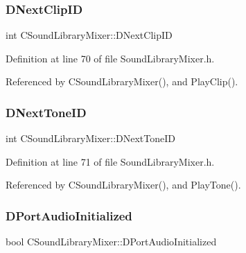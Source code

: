 \subsubsection{\texorpdfstring{D\+Next\+Clip\+ID}{DNextClipID}}
{\footnotesize\ttfamily int C\+Sound\+Library\+Mixer\+::\+D\+Next\+Clip\+ID\hspace{0.3cm}{\ttfamily [protected]}}



Definition at line 70 of file Sound\+Library\+Mixer.\+h.



Referenced by C\+Sound\+Library\+Mixer(), and Play\+Clip().

\hypertarget{classCSoundLibraryMixer_a88efc1ea710744bceadccf66967f9736}{}\label{classCSoundLibraryMixer_a88efc1ea710744bceadccf66967f9736} 
\subsubsection{\texorpdfstring{D\+Next\+Tone\+ID}{DNextToneID}}
{\footnotesize\ttfamily int C\+Sound\+Library\+Mixer\+::\+D\+Next\+Tone\+ID\hspace{0.3cm}{\ttfamily [protected]}}



Definition at line 71 of file Sound\+Library\+Mixer.\+h.



Referenced by C\+Sound\+Library\+Mixer(), and Play\+Tone().

\hypertarget{classCSoundLibraryMixer_a1c78419f5e6cfdf4bc879bb5eedf52f0}{}\label{classCSoundLibraryMixer_a1c78419f5e6cfdf4bc879bb5eedf52f0} 
\subsubsection{\texorpdfstring{D\+Port\+Audio\+Initialized}{DPortAudioInitialized}}
{\footnotesize\ttfamily bool C\+Sound\+Library\+Mixer\+::\+D\+Port\+Audio\+Initialized\hspace{0.3cm}{\ttfamily [protected]}}



